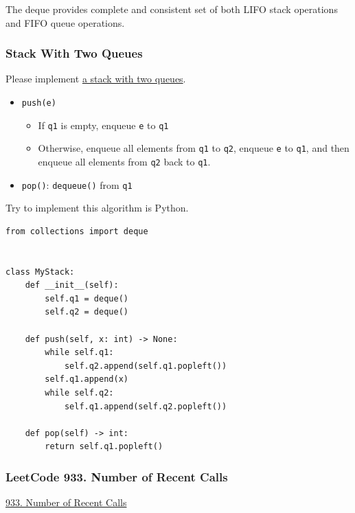 \documentclass[aspectratio=169, 14pt]{beamer}
\begin{document}
{
\begin{frame}[standout]
The \alert{deque} provides complete and consistent set of both LIFO stack operations and FIFO queue operations.
\end{frame}
}

\begin{frame}
    \frametitle{Stack With Two Queues}
Please implement \href{https://leetcode.com/problems/implement-stack-using-queues/}{a stack with two queues}.    

\begin{itemize}
    \item \texttt{push(e)}
        \begin{itemize}
            \item If \texttt{q1} is empty, enqueue \texttt{e} to \texttt{q1}
            \item Otherwise, enqueue all elements from \texttt{q1} to \texttt{q2}, enqueue \texttt{e} to \texttt{q1}, and then enqueue all elements from \texttt{q2} back to \texttt{q1}.
        \end{itemize}
    \item \texttt{pop()}: \texttt{dequeue()} from \texttt{q1}
\end{itemize}

{\large {}} Try to implement this algorithm is Python.
\end{frame}

\begin{frame}[fragile]

\begin{verbatim}
from collections import deque


class MyStack:
    def __init__(self):
        self.q1 = deque()
        self.q2 = deque()

    def push(self, x: int) -> None:
        while self.q1:
            self.q2.append(self.q1.popleft())
        self.q1.append(x)
        while self.q2:
            self.q1.append(self.q2.popleft())

    def pop(self) -> int:
        return self.q1.popleft()
\end{verbatim}

\end{frame}

\begin{frame}[fragile]
    \frametitle{LeetCode 933. Number of Recent Calls}
\href{https://leetcode.com/problems/number-of-recent-calls/}{933. Number of Recent Calls}

\end{frame}
\end{document}
